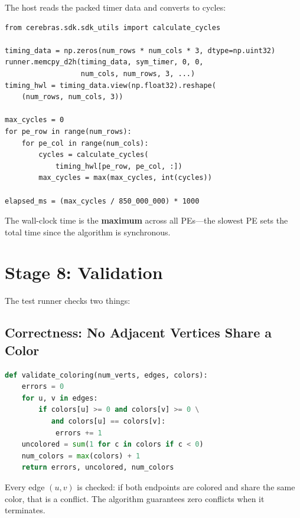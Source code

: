 \documentclass[11pt,letterpaper]{article}
\begin{document}
The host reads the packed timer data and converts to cycles:

\begin{lstlisting}[language=PyHost, caption={Cycle count computation (from \texttt{cerebras\_host.py})}, label=lst:cycles]
from cerebras.sdk.sdk_utils import calculate_cycles

timing_data = np.zeros(num_rows * num_cols * 3, dtype=np.uint32)
runner.memcpy_d2h(timing_data, sym_timer, 0, 0,
                  num_cols, num_rows, 3, ...)
timing_hwl = timing_data.view(np.float32).reshape(
    (num_rows, num_cols, 3))

max_cycles = 0
for pe_row in range(num_rows):
    for pe_col in range(num_cols):
        cycles = calculate_cycles(
            timing_hwl[pe_row, pe_col, :])
        max_cycles = max(max_cycles, int(cycles))

elapsed_ms = (max_cycles / 850_000_000) * 1000
\end{lstlisting}

The wall-clock time is the \textbf{maximum} across all PEs---the slowest PE sets the total time since the algorithm is synchronous.

\section{Stage 8: Validation}
\label{sec:validation}

The test runner checks two things:

\subsection{Correctness: No Adjacent Vertices Share a Color}

\begin{lstlisting}[language=Python, caption={Validation (from \texttt{run\_csl\_tests.py})}, label=lst:validate]
def validate_coloring(num_verts, edges, colors):
    errors = 0
    for u, v in edges:
        if colors[u] >= 0 and colors[v] >= 0 \
           and colors[u] == colors[v]:
            errors += 1
    uncolored = sum(1 for c in colors if c < 0)
    num_colors = max(colors) + 1
    return errors, uncolored, num_colors
\end{lstlisting}

Every edge $(u, v)$ is checked: if both endpoints are colored and share the same color, that is a conflict. The algorithm guarantees zero conflicts when it terminates.
\end{document}
